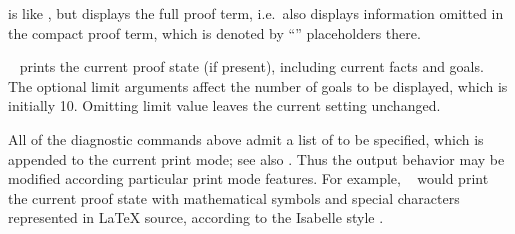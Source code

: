 \begin{isabellebody}
\begin{isamarkuptext}
\begin{description}
  \item \hyperlink{command.full-prf}{\mbox{}} is like \hyperlink{command.prf}{\mbox{}}, but displays
  the full proof term, i.e.\ also displays information omitted in the
  compact proof term, which is denoted by ``'' placeholders
  there.

  \item \hyperlink{command.pr}{\mbox{}}~ prints the current proof state
  (if present), including current facts and goals.  The optional limit
  arguments affect the number of goals to be displayed, which is
  initially 10.  Omitting limit value leaves the current setting
  unchanged.

  \end{description}

  All of the diagnostic commands above admit a list of 
  to be specified, which is appended to the current print mode; see
  also .  Thus the output behavior may be
  modified according particular print mode features.  For example,
  \hyperlink{command.pr}{\mbox{}}~ would print the current
  proof state with mathematical symbols and special characters
  represented in {\LaTeX} source, according to the Isabelle style
  \cite{isabelle-sys}.


\end{isamarkuptext}
\end{isabellebody}

